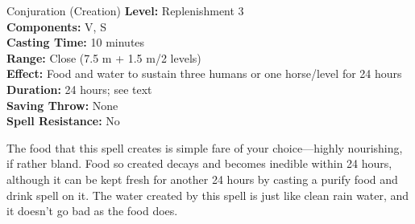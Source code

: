 {Conjuration (Creation)}
{
	\textbf{Level:}
	Replenishment 3\\
	\textbf{Components:}
	V, S\\
	\textbf{Casting Time:}
	10 minutes\\
	\textbf{Range:}
	Close (7.5 m + 1.5 m/2 levels)\\
	\textbf{Effect:}
	Food and water to sustain three humans or one horse/level for 24 hours\\
	\textbf{Duration:}
	24 hours; see text\\
	\textbf{Saving Throw:}
	None\\
	\textbf{Spell Resistance:}
	No\\
}
{
	The food that this spell creates is simple fare of your choice---highly nourishing, if rather bland. Food so created decays and becomes inedible within 24 hours, although it can be kept fresh for another 24 hours by casting a purify food and drink spell on it. The water created by this spell is just like clean rain water, and it doesn't go bad as the food does.

}
